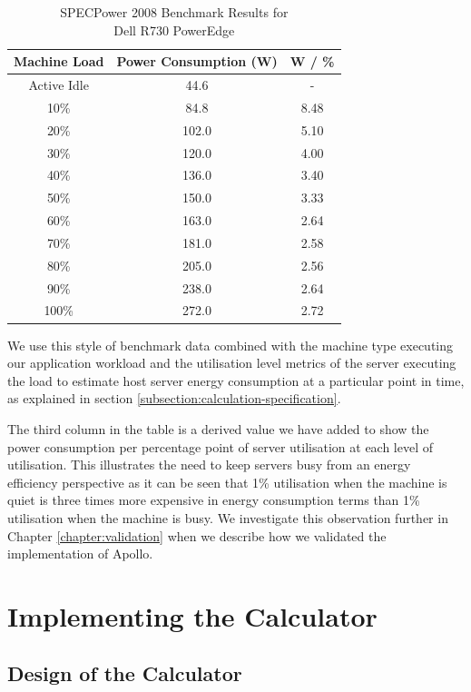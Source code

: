 \begin{table}
\centering
\caption{SPECPower 2008 Benchmark Results for \\Dell R730 PowerEdge}
\label{table:powervalues}
\footnotesize
\begin{tabular}{|c|c|c|}
\hline
Machine Load & Power Consumption (W) & W / \% \\
\hline
\hline
Active Idle  &  44.6 & -    \\
10\%         &  84.8 & 8.48 \\
20\%         & 102.0 & 5.10 \\
30\%         & 120.0 & 4.00 \\
40\%         & 136.0 & 3.40 \\
50\%         & 150.0 & 3.33 \\
60\%         & 163.0 & 2.64 \\
70\%         & 181.0 & 2.58 \\
80\%         & 205.0 & 2.56 \\
90\%         & 238.0 & 2.64 \\
100\%        & 272.0 & 2.72 \\
\hline
\end{tabular}
\end{table}

We use this style of benchmark data combined with the machine type executing our application workload and the utilisation level metrics of the server executing the load to estimate host server energy consumption at a particular point in time, as explained in section \ref{subsection:calculation-specification}.

The third column in the table is a derived value we have added to show the power consumption per percentage point of server utilisation at each level of utilisation.  This illustrates the need to keep servers busy from an energy efficiency perspective as it can be seen that 1\% utilisation when the machine is quiet is three times more expensive in energy consumption terms than 1\% utilisation when the machine is busy.  We investigate this observation further in Chapter \ref{chapter:validation} when we describe how we validated the implementation of Apollo.

\section{Implementing the Calculator}

\subsection{Design of the Calculator}

